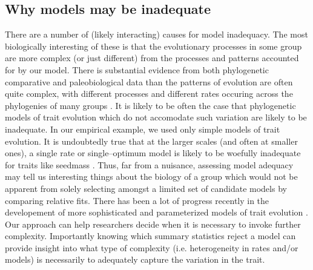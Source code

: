 \documentclass[a4paper,12pt]{article}
\begin{document}
\subsection*{Why models may be inadequate}
There are a number of (likely interacting) causes for model inadequacy. The most biologically interesting of these is that the evolutionary processes in some group are more complex (or just different) from the processes and patterns accounted for by our model.  There is substantial evidence from both phylogenetic comparative and paleobiological data than the patterns of evolution are often quite complex, with different processes and different rates occuring across the phylogenies of many groups \citep[e.g.][]{Simpson1953, Foote1997, Grey2008, Hunt2012, Hopkins2012, PennellPE}. It is likely to be often the case that phylogenetic models of trait evolution which do not accomodate  such variation are likely to be inadequate. In our empirical example, we used only simple models of trait evolution. It is undoubtedly true that at the larger scales (and often at smaller ones), a single rate or single--optimum model is likely to be woefully inadequate for traits like seedmass \citep[see][]{Moles2005}. Thus, far from a nuisance, assessing model adequacy may tell us interesting things about the biology of a group which would not be apparent from solely selecting amongst a limited set of candidate models by comparing relative fits. There has been a lot of progress recently in the developement of more sophisticated and parameterized models of trait evolution \citep[e.g.][]{ButlerKing2004, Omeara2006, FitzJohn2010, Eastman2011, Venditti2011, Revell2012, Beaulieu2012}. Our approach can help researchers decide when it is necessary to invoke further complexity. Importantly knowing which summary statistics reject a model can provide insight into what type of complexity (i.e. heterogeneity in rates and/or models) is necessarily to adequately capture the variation in the trait.
\end{document}
